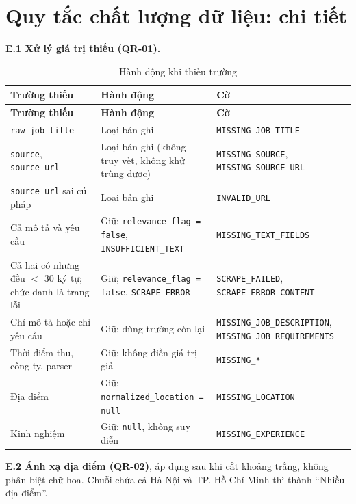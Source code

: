 \documentclass[12pt]{article}
\newcommand{\code}[1]{\texttt{#1}}
\begin{document}
\section{Quy tắc chất lượng dữ liệu: chi tiết}
\label{app:quality}
\textbf{E.1 Xử lý giá trị thiếu (QR-01).}

{\small
\begin{longtable}{>{\raggedright\arraybackslash}p{4.2cm} >{\raggedright\arraybackslash}p{5cm} >{\raggedright\arraybackslash}p{5.2cm}}
\caption{Hành động khi thiếu trường}\label{tab:missing}\\
\toprule
\textbf{Trường thiếu} & \textbf{Hành động} & \textbf{Cờ} \\
\midrule
\endfirsthead
\toprule
\textbf{Trường thiếu} & \textbf{Hành động} & \textbf{Cờ} \\
\midrule
\endhead
\code{raw\_job\_title} & Loại bản ghi & \code{MISSING\_JOB\_TITLE} \\
\code{source}, \code{source\_url} & Loại bản ghi (không truy vết, không khử trùng được) & \code{MISSING\_SOURCE}, \code{MISSING\_SOURCE\_URL} \\
\code{source\_url} sai cú pháp & Loại bản ghi & \code{INVALID\_URL} \\
Cả mô tả và yêu cầu & Giữ; \code{relevance\_flag = false}, \code{INSUFFICIENT\_TEXT} & \code{MISSING\_TEXT\_FIELDS} \\
Cả hai có nhưng đều $<$ 30 ký tự; chức danh là trang lỗi & Giữ; \code{relevance\_flag = false}, \code{SCRAPE\_ERROR} & \code{SCRAPE\_FAILED}, \code{SCRAPE\_ERROR\_CONTENT} \\
Chỉ mô tả hoặc chỉ yêu cầu & Giữ; dùng trường còn lại & \code{MISSING\_JOB\_DESCRIPTION}, \code{MISSING\_JOB\_REQUIREMENTS} \\
Thời điểm thu, công ty, parser & Giữ; không điền giá trị giả & \code{MISSING\_*} \\
Địa điểm & Giữ; \code{normalized\_location = null} & \code{MISSING\_LOCATION} \\
Kinh nghiệm & Giữ; \code{null}, không suy diễn & \code{MISSING\_EXPERIENCE} \\
\bottomrule
\end{longtable}
}

\textbf{E.2 Ánh xạ địa điểm (QR-02)}, áp dụng sau khi cắt khoảng trắng, không phân biệt chữ hoa. Chuỗi chứa cả Hà Nội và TP. Hồ Chí Minh thì thành ``Nhiều địa điểm''.
\end{document}
